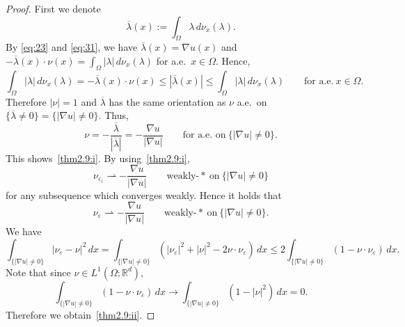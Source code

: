 \documentclass{amsart}
\theoremstyle{definition}
\def\R{{\mathbb{R}}}
\begin{document}
\begin{proof}
First we denote
\[
\overline{\lambda} (x) := \int_{\Omega} \lambda \, d\nu_{x} (\lambda).
\]
By \eqref{eq:23} and \eqref{eq:31}, we have $\overline{\lambda} (x) = \nabla u (x)$ 
and 
$-\overline{\lambda} (x) \cdot \nu (x) = \int_{\Omega} |\lambda| \, d\nu_x (\lambda) $
for a.e.\ $x \in \Omega$.
Hence,
\[
\int_{\Omega} |\lambda| \, d\nu_x (\lambda)
=-\overline{\lambda} (x) \cdot \nu (x) \leq 
|\overline{\lambda} (x)| \leq 
\int_{\Omega} |\lambda| \, d\nu_x (\lambda)
\qquad \text{for a.e.} \ x \in \Omega.
\]
Therefore $|\nu|=1$ and
$\overline{\lambda} $
has the same orientation as $ \nu $ a.e.\ on $\{ \overline{\lambda} \not =0 \} = 
\{ |\nabla u| \not =0 \} $. Thus,
\[
\nu =- \frac{\overline{\lambda}}{|\overline{\lambda}|}
= -\frac{\nabla u}{|\nabla u|}
\qquad \text{for a.e.\ on} \ \{|\nabla u|\not =0\}.
\]
This shows~\eqref{thm2.9:i}. By using~\eqref{thm2.9:i}, 
\[
\nu_{\varepsilon_i} \rightharpoonup -\frac{\nabla u}{|\nabla u|}
\qquad \text{weakly-}\ast \ \text{on} \ 
\{|\nabla u|\not = 0\}
\]
for any subsequence which converges weakly. 
Hence it holds that
\[
\nu_{\varepsilon} \rightharpoonup -\frac{\nabla u}{|\nabla u|}
\qquad \text{weakly-}\ast \ \text{on} \
\{|\nabla u|\not = 0\}.
\]
We have
\[
\int_{\{|\nabla u|\not =0\}} 
|\nu_\varepsilon -\nu|^2 \, dx
=
\int_{\{|\nabla u|\not =0\}} 
(|\nu_\varepsilon|^2 + |\nu|^2 -2 \nu \cdot\nu_\varepsilon) \, dx
\leq
2\int_{\{|\nabla u|\not =0\}} 
(1 - \nu \cdot \nu_\varepsilon) \, dx.
\]
Note that since $\nu \in L^1 (\Omega; \R^d)$, 
\[
\int_{\{|\nabla u|\not =0\}} 
(1 - \nu \cdot \nu_\varepsilon) \, dx
\to 
\int_{\{|\nabla u|\not =0\}} 
(1 - |\nu|^2) \, dx
=0.
\]
Therefore we obtain~\eqref{thm2.9:ii}.
\end{proof}
\end{document}

